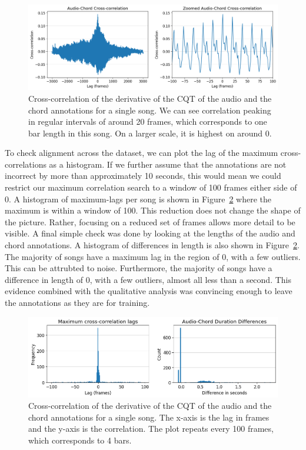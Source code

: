 \begin{figure}[h]
    \centering
    \includegraphics[width=1.0\textwidth]{figures/cross_correlation.png}
    \caption{Cross-correlation of the derivative of the CQT of the audio and the chord annotations for a single song. We can see correlation peaking in regular intervals of around 20 frames, which corresponds to one bar length in this song. On a larger scale, it is highest on around 0.}\label{fig:cross-correlation}
\end{figure}

To check alignment across the dataset, we can plot the lag of the maximum cross-correlations as a histogram. If we further assume that the annotations are not incorrect by more than approximately 10 seconds, this would mean we could restrict our maximum correlation search to a window of 100 frames either side of 0.  A histogram of maximum-lags per song is shown in Figure~\ref{fig:durations-and-lags} where the maximum is within a window of 100. This reduction does not change the shape of the picture. Rather, focusing on a reduced set of frames allows more detail to be visible. A final simple check was done by looking at the lengths of the audio and chord annotations. A histogram of differences in length is also shown in Figure~\ref{fig:durations-and-lags}. The majority of songs have a maximum lag in the region of 0, with a few outliers. This can be attrubted to noise. Furthermore, the majority of songs have a difference in length of 0, with a few outliers, almost all less than a second. This evidence combined with the qualitative analysis was convincing enough to leave the annotations as they are for training.

\begin{figure}[h]
    \centering
    \includegraphics[width=1.0\textwidth]{figures/duration_diffs_and_lags.png}
    \caption{Cross-correlation of the derivative of the CQT of the audio and the chord annotations for a single song. The x-axis is the lag in frames and the y-axis is the correlation. The plot repeats every 100 frames, which corresponds to 4 bars.}\label{fig:durations-and-lags}
\end{figure}


